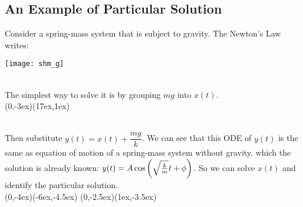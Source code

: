 \documentclass[class=article, crop=false, 12pt]{standalone}
\begin{document}
\subsection{An Example of Particular Solution}

Consider a spring-mass system that is subject to gravity. 
The Newton's  Law writes:

\begin{center}
    \begin{minipage}{0.4\linewidth}
        \centering
    \end{minipage}
    \hspace{0.05\textwidth}
    \begin{minipage}{0.15\linewidth}
        \centering
        \texttt{[image: shm\_g]}
    \end{minipage}
\end{center}


\hfill\\[1ex]
The simplest way to solve it is by grouping $mg$ into $x(t)$. 
\\
{(0,-3ex)}{(17ex,1ex)}

\hfill\\
Then substitute $y(t) = x(t) + \dfrac{mg}{k}$. 
We can see that this ODE of $y(t)$ is the same as equation of motion of a spring-mass system without gravity.
which the solution is already known: $y(t) = A\cos\qty(\sqrt{\frac{k}{m}}t+\phi)$.
So we can solve $x(t)$ and identify the particular solution.
\\[4em]
{(0,-4ex)}{(-6ex,-4.5ex)}
{(0,-2.5ex)}{(1ex,-3.5ex)}
\end{document}

